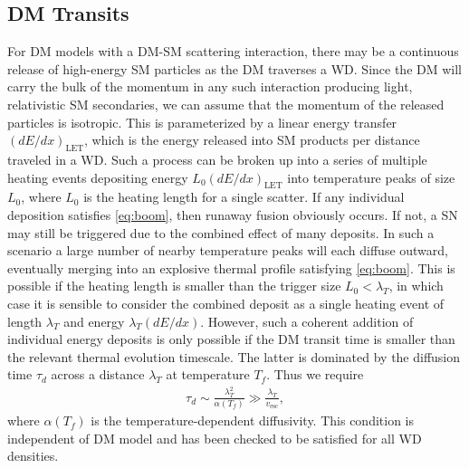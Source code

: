 \documentclass[twocolumn,showpacs,preprintnumbers,amsmath,amssymb,prd]{revtex4}
\begin{document}
\subsection{DM Transits}
\label{sec:DMdecay}

For DM models with a DM-SM scattering interaction, there may be a continuous release of high-energy SM particles as the DM traverses a WD.
Since the DM will carry the bulk of the momentum in any such interaction producing light, relativistic SM secondaries, we can assume that the momentum of the released particles is isotropic.
This is parameterized by a linear energy transfer $(dE/dx)_\text{LET}$, which is the energy released into SM products per distance traveled in a WD.
Such a process can be broken up into a series of multiple heating events depositing energy $L_0 (d E/d x)_\text{LET}$ into temperature peaks of size $L_0$, where $L_0$ is the heating length for a single scatter. 
If any individual deposition satisfies \eqref{eq:boom}, then runaway fusion obviously occurs.
If not, a SN may still be triggered due to the combined effect of many deposits.
In such a scenario a large number of nearby temperature peaks will each diffuse outward, eventually merging into an explosive thermal profile satisfying \eqref{eq:boom}.
This is possible if the heating length is smaller than the trigger size $L_0 < \lambda_T$, in which case it is sensible to consider the combined deposit as a single heating event of length $\lambda_T$ and energy $\lambda_T (d E/d x)$.
However, such a coherent addition of individual energy deposits is only possible if the DM transit time is smaller than the relevant thermal evolution timescale.
The latter is dominated by the diffusion time $\tau_d$ across a distance $\lambda_T$ at temperature $T_f$.
Thus we require
\begin{align}
\tau_d \sim \frac{\lambda_T^2}{\alpha(T_f)} \gg \frac{\lambda_T}{v_\text{esc}},
\label{eq:SlowDiffusion}
\end{align}
where $\alpha(T_f)$ is the temperature-dependent diffusivity.
This condition is independent of DM model and has been checked to be satisfied for all WD densities.
\end{document}
